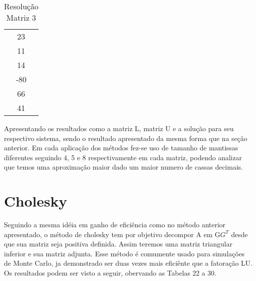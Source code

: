 \documentclass[12pt]{article}
\begin{document}
\begin{table}[!h]
    \centering
    \begin{tabular}{|c|}
        23\\
        11\\
        14\\
        -80\\
        66\\
        41\\
    \end{tabular}
    \caption{Resolução Matriz 3}
    \label{tab:dir}
\end{table}


Apresentando os resultados como  a matriz L, matriz U e a solução para seu respectivo sistema, sendo o resultado apresentado da mesma forma que na seção anterior. Em cada aplicação dos métodos fez-se uso de tamanho de mantissas diferentes seguindo 4, 5 e 8 respectivamente em cada matriz, podendo analizar que temos uma aproximação maior dado um maior numero de cassas decimais.

\section{Cholesky}

Seguindo a mesma idéia em ganho de eficiência como no método anterior apresentado, o método de cholesky tem por objetivo decompor A em G$G^{T}$ desde que sua matriz seja positiva definida. Assim teremos uma matriz triangular inferior e sua matriz adjunta. Esse método é comumente usado para simulações de Monte Carlo, ja demonstrado ser duas vezes mais eficiênte que a fatoração LU. Os resultados podem ser visto a seguir, obervando as Tabelas 22 a 30.
\end{document}
